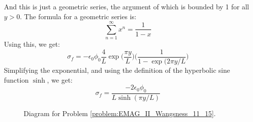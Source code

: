 \begin{solution}
                    And this is just a geometric series, the argument
                    of which is bounded by 1 for all $y>0$. The formula
                    for a geometric series is:
                    \begin{equation}
                        \sum_{n=1}^{\infty}x^{n}
                        =\frac{1}{1-x}
                    \end{equation}
                    Using this, we get:
                    \begin{equation}
                        \sigma_{f}=\minus\epsilon_{0}\phi_{0}\frac{4}{L}
                            \exp\big(\frac{\pi{y}}{L}\big)
                            \Big(\frac{1}{1-\exp(2\pi{y}/L}\Big)
                    \end{equation}
                    Simplifying the exponential, and using the definition
                    of the hyperbolic sine function $\sinh$, we get:
                    \begin{equation}
                        \sigma_{f}=
                            \frac{\minus2\epsilon_{0}\phi_{0}}
                                 {L\sinh(\pi{y}/L)}
                    \end{equation}
                \end{solution}
                \begin{figure}[H]
                    \centering
                    \captionsetup{type=figure}
                    \caption{Diagram for Problem
                             \ref{problem:EMAG_II_Wangsness_11_15}.}
                    \label{fig:EMAG_II_Wangsness_11_15}
                \end{figure}